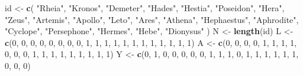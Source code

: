 \documentclass[
  10pt,
]{book}
\newenvironment{Shaded}{\begin{snugshade}}{\end{snugshade}}
\newcommand{\DecValTok}[1]{\textcolor[rgb]{0.00,0.00,0.81}{#1}}
\newcommand{\KeywordTok}[1]{\textcolor[rgb]{0.13,0.29,0.53}{\textbf{#1}}}
\newcommand{\NormalTok}[1]{#1}
\newcommand{\StringTok}[1]{\textcolor[rgb]{0.31,0.60,0.02}{#1}}
\begin{document}
\begin{Shaded}
\begin{Highlighting}[]
\NormalTok{id <-}\StringTok{ }\KeywordTok{c}\NormalTok{(}
  \StringTok{"Rheia"}\NormalTok{,}
  \StringTok{"Kronos"}\NormalTok{,}
  \StringTok{"Demeter"}\NormalTok{,}
  \StringTok{"Hades"}\NormalTok{,}
  \StringTok{"Hestia"}\NormalTok{,}
  \StringTok{"Poseidon"}\NormalTok{,}
  \StringTok{"Hera"}\NormalTok{,}
  \StringTok{"Zeus"}\NormalTok{,}
  \StringTok{"Artemis"}\NormalTok{,}
  \StringTok{"Apollo"}\NormalTok{,}
  \StringTok{"Leto"}\NormalTok{,}
  \StringTok{"Ares"}\NormalTok{,}
  \StringTok{"Athena"}\NormalTok{,}
  \StringTok{"Hephaestus"}\NormalTok{,}
  \StringTok{"Aphrodite"}\NormalTok{,}
  \StringTok{"Cyclope"}\NormalTok{,}
  \StringTok{"Persephone"}\NormalTok{,}
  \StringTok{"Hermes"}\NormalTok{,}
  \StringTok{"Hebe"}\NormalTok{,}
  \StringTok{"Dionysus"}
\NormalTok{)}
\NormalTok{N <-}\StringTok{ }\KeywordTok{length}\NormalTok{(id)}
\NormalTok{L <-}\StringTok{ }\KeywordTok{c}\NormalTok{(}\DecValTok{0}\NormalTok{, }\DecValTok{0}\NormalTok{, }\DecValTok{0}\NormalTok{, }\DecValTok{0}\NormalTok{, }\DecValTok{0}\NormalTok{, }\DecValTok{0}\NormalTok{, }\DecValTok{0}\NormalTok{, }\DecValTok{0}\NormalTok{, }\DecValTok{1}\NormalTok{, }\DecValTok{1}\NormalTok{, }\DecValTok{1}\NormalTok{, }\DecValTok{1}\NormalTok{, }\DecValTok{1}\NormalTok{, }\DecValTok{1}\NormalTok{, }\DecValTok{1}\NormalTok{, }\DecValTok{1}\NormalTok{, }\DecValTok{1}\NormalTok{, }\DecValTok{1}\NormalTok{, }\DecValTok{1}\NormalTok{, }\DecValTok{1}\NormalTok{)}
\NormalTok{A <-}\StringTok{ }\KeywordTok{c}\NormalTok{(}\DecValTok{0}\NormalTok{, }\DecValTok{0}\NormalTok{, }\DecValTok{0}\NormalTok{, }\DecValTok{0}\NormalTok{, }\DecValTok{1}\NormalTok{, }\DecValTok{1}\NormalTok{, }\DecValTok{1}\NormalTok{, }\DecValTok{1}\NormalTok{, }\DecValTok{0}\NormalTok{, }\DecValTok{0}\NormalTok{, }\DecValTok{0}\NormalTok{, }\DecValTok{1}\NormalTok{, }\DecValTok{1}\NormalTok{, }\DecValTok{1}\NormalTok{, }\DecValTok{1}\NormalTok{, }\DecValTok{1}\NormalTok{, }\DecValTok{1}\NormalTok{, }\DecValTok{1}\NormalTok{, }\DecValTok{1}\NormalTok{, }\DecValTok{1}\NormalTok{)}
\NormalTok{Y <-}\StringTok{ }\KeywordTok{c}\NormalTok{(}\DecValTok{0}\NormalTok{, }\DecValTok{1}\NormalTok{, }\DecValTok{0}\NormalTok{, }\DecValTok{0}\NormalTok{, }\DecValTok{0}\NormalTok{, }\DecValTok{0}\NormalTok{, }\DecValTok{0}\NormalTok{, }\DecValTok{1}\NormalTok{, }\DecValTok{1}\NormalTok{, }\DecValTok{1}\NormalTok{, }\DecValTok{0}\NormalTok{, }\DecValTok{1}\NormalTok{, }\DecValTok{1}\NormalTok{, }\DecValTok{1}\NormalTok{, }\DecValTok{1}\NormalTok{, }\DecValTok{1}\NormalTok{, }\DecValTok{1}\NormalTok{, }\DecValTok{0}\NormalTok{, }\DecValTok{0}\NormalTok{, }\DecValTok{0}\NormalTok{)}

\end{Highlighting}
\end{Shaded}
\end{document}
